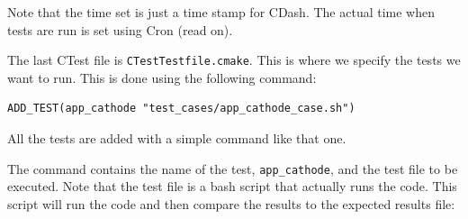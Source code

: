 Note that the time set is just a time stamp for CDash. The actual time when tests are run is set using Cron (read on).

The last CTest file is \verb!CTestTestfile.cmake!. This is where we specify the tests we want to run. This is done using the following command:

\small \begin{lstlisting}
ADD_TEST(app_cathode "test_cases/app_cathode_case.sh")
\end{lstlisting}\normalsize

All the tests are added with a simple command like that one.

The command contains the name of the test, \verb!app_cathode!, and the test file to be executed. Note that the test file is a bash script that actually runs the code. This script will run the code and then compare the results to the expected results file:

